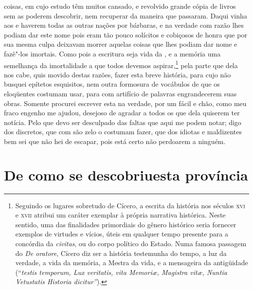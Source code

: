 coisas, em cujo estudo têm muitos  cansado, e revolvido
grande cópia de livros sem as poderem descobrir, nem recuperar da
maneira que passaram. Daqui vinha aos  e  haverem todas as
outras nações por bárbaras, e na verdade com razão lhes podiam dar este			%
nome pois eram tão pouco solícitos e cobiçosos de honra que por sua
mesma culpa deixavam morrer aquelas coisas que lhes podiam dar nome e
fazê"-los imortais. Como pois a escritura seja vida da , e a
memória uma semelhança da imortalidade a que todos devemos
aspirar,\footnote{ Seguindo os lugares sobretudo de Cícero, a escrita da
história nos séculos \textsc{xvi} e \textsc{xvii} atribui um caráter exemplar à própria
narrativa histórica. Neste sentido, uma das finalidades primordiais do
gênero histórico seria fornecer exemplos de virtudes e vícios, úteis em
qualquer tempo presente para a concórdia da \textit{civitas}, ou do corpo
político do Estado. Numa famosa passagem do \textit{De oratore}, 
Cícero diz ser a história testemunha do tempo, a luz da verdade, a vida
da memória, a Mestra da vida, e a mensageira da antigüidade (``\textit{testis
temporum, Lux veritatis, vita Memori\ae, Magistra vit\ae, Nuntia
Vetustatis Historia dicitur''}).} pela parte que dela nos cabe, quis
movido destas razões, fazer esta breve história, para cujo 
não busquei epítetos esquisitos, nem outra formosura de vocábulos de
que os eloqüentes  costumam usar, para com artifício de
palavras engrandecerem suas obras. Somente procurei escrever esta na
verdade, por um  fácil e chão, como meu fraco engenho me ajudou,       %
desejoso de agradar a todos os que dela quiserem ter notícia. Pelo que
devo ser desculpado das faltas que aqui me podem notar; digo dos
discretos, que com são zelo o costumam fazer, que dos idiotas e
maldizentes bem sei que não hei de escapar, pois está certo não perdoarem a ninguém.


\chapter[De como se descobriu esta província]{De como se
descobriu\break esta província}							%

